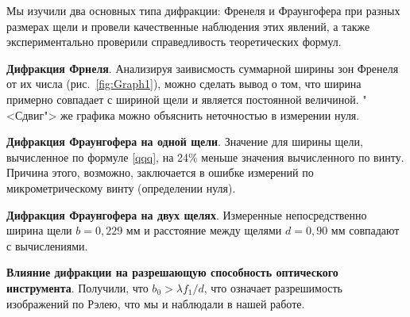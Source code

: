 \documentclass[a4paper,12pt]{article} %
\begin{document}
Мы изучили два основных типа дифракции: Френеля и Фраунгофера при разных размерах щели и провели качественные наблюдения этих явлений, а также экспериментально проверили справедливость теоретических формул.

\textbf{Дифракция Фрнеля}. Анализируя заивисмость суммарной ширины зон Френеля от их числа (рис.~\ref{fig:Graph1}), можно сделать вывод о том, что ширина примерно совпадает с шириной щели и является постоянной величиной. "<Сдвиг"> же графика можно объяснить неточностью в измерении нуля.

\textbf{Дифракция Фраунгофера на одной щели}. Значение для ширины щели, вычисленное по формуле \eqref{qqq}, на 24\% меньше значения вычисленного по винту. Причина этого, возможно, заключается в ошибке измерений по микрометрическому винту (определении нуля).

\textbf{Дифракция Фраунгофера на двух щелях}. Измеренные непосредственно ширина щели $b = 0,229$ мм и расстояние между щелями $ d = 0,90 $ мм совпадают с вычислениями.

\textbf{Влияние дифракции на разрешающую способность оптического инструмента}. Получили, что $b_0 > \lambda f_1/d$, что означает разрешимость изображений по Рэлею, что мы и наблюдали в нашей работе.
\end{document}
